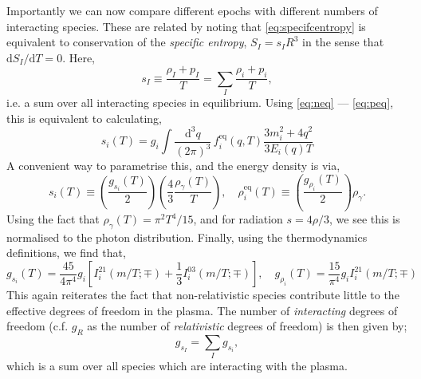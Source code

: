 \documentclass[11pt]{article}
\numberwithin{equation}{section}
\numberwithin{figure}{section}
\numberwithin{table}{section}
\begin{document}
Importantly we can now compare different epochs with different numbers of interacting species. These are related by noting that \eqref{eq:specifcentropy} is equivalent to conservation of the \textit{specific entropy}, $S_I = s_I R^3$ in the sense that $\mathrm{d}S_I/\mathrm{d}T = 0$. Here,
\begin{equation}
s_I \equiv \frac{\rho_I + p_I}{T} = \sum_{I}{\frac{\rho_i + p_i}{T}},
\end{equation}
i.e. a sum over all interacting species in equilibrium. Using \eqref{eq:neq} --- \eqref{eq:peq}, this is equivalent to calculating,
\begin{equation}
s_i(T) = g_i \int{\frac{\mathrm{d}^3q}{(2\pi)^3}\,f_i^{\mathrm{eq}}(q, T) \frac{3m_i^2 + 4q^2}{3E_i(q) T}}
\end{equation}
A convenient way to parametrise this, and the energy density is via,
\begin{equation}
s_i(T) \equiv \left(\frac{g_{s_i}(T)}{2}\right)\left(\frac{4}{3}\frac{\rho_\gamma(T)}{T}\right), \quad \rho_i^{\mathrm{eq}}(T) \equiv \left(\frac{g_{\rho_i}(T)}{2}\right)\rho_\gamma.
\end{equation}
Using the fact that $\rho_\gamma(T) = \pi^2 T^4/15$, and for radiation $s = 4\rho/3$, we see this is normalised to the photon distribution. Finally, using the thermodynamics definitions, we find that,
\begin{equation}
g_{s_i}(T) = \frac{45}{4\pi^4}g_i \left[I_i^{21}(m/T; \mp) + \frac{1}{3}I_i^{03}(m/T; \mp)\right], \quad g_{\rho_i}(T) = \frac{15}{\pi^4}g_i I_i^{21}(m/T; \mp)
\end{equation}
This again reiterates the fact that non-relativistic species contribute little to the effective degrees of freedom in the plasma. The number of \textit{interacting} degrees of freedom (c.f. $g_R$ as the number of \textit{relativistic} degrees of freedom) is then given by;
\begin{equation}
g_{s_I} = \sum_{I}{g_{s_i}},
\end{equation}
which is a sum over all species which are interacting with the plasma.
\end{document}
